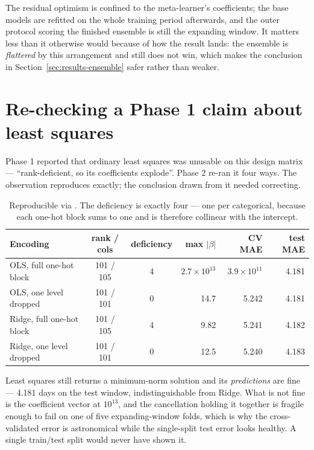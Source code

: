 The residual optimism is confined to the meta-learner's coefficients; the base
models are refitted on the whole training period afterwards, and the outer
protocol scoring the finished ensemble is still the expanding window. It matters
less than it otherwise would because of how the result lands: the ensemble is
\emph{flattered} by this arrangement and still does not win, which makes the
conclusion in Section~\ref{sec:results-ensemble} safer rather than weaker.

\section{Re-checking a Phase 1 claim about least squares}
\label{app:encoding}

Phase 1 reported that ordinary least squares was unusable on this design matrix
--- ``rank-deficient, so its coefficients explode''. Phase 2 re-ran it four ways.
The observation reproduces exactly; the conclusion drawn from it needed
correcting.

\begin{table}[htbp]
\centering
\caption{Reproducible via . The
deficiency is exactly four --- one per categorical, because each one-hot block
sums to one and is therefore collinear with the intercept.}
\label{tab:encoding}
\small
\begin{tabular}{@{}lccrrr@{}}
\toprule
\textbf{Encoding} & \textbf{rank / cols} & \textbf{deficiency} &
\textbf{max $|\beta|$} & \textbf{CV MAE} & \textbf{test MAE} \\
\midrule
OLS, full one-hot block   & 101 / 105 & 4 & $2.7\times10^{13}$ & $3.9\times10^{11}$ & 4.181 \\
OLS, one level dropped    & 101 / 101 & 0 & 14.7  & 5.242 & 4.181 \\
Ridge, full one-hot block & 101 / 105 & 4 & 9.82  & 5.241 & 4.182 \\
Ridge, one level dropped  & 101 / 101 & 0 & 12.5  & 5.240 & 4.183 \\
\bottomrule
\end{tabular}
\end{table}

Least squares still returns a minimum-norm solution and its \emph{predictions}
are fine --- 4.181 days on the test window, indistinguishable from Ridge. What is
not fine is the coefficient vector at $10^{13}$, and the cancellation holding it
together is fragile enough to fail on one of five expanding-window folds, which
is why the cross-validated error is astronomical while the single-split test
error looks healthy. A single train/test split would never have shown it.

